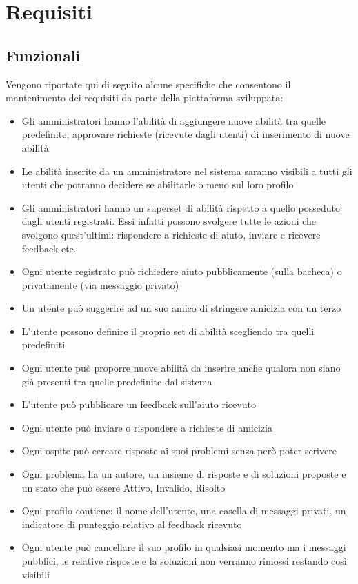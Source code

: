 \documentclass[a4paper,12pt]{article}
\begin{document}
\clearpage

\section{Requisiti}
\subsection{Funzionali}
Vengono riportate qui di seguito alcune specifiche che consentono il mantenimento dei requisiti da parte della piattaforma sviluppata:
\begin{itemize}
\item Gli amministratori hanno l’abilità di aggiungere nuove abilità tra quelle predefinite, approvare richieste (ricevute dagli utenti) di inserimento di nuove abilità
\item Le abilità inserite da un amministratore nel sistema saranno visibili a tutti gli utenti che potranno decidere se abilitarle o meno sul loro profilo
\item Gli amministratori hanno un superset di abilità rispetto a quello posseduto dagli utenti registrati. Essi infatti possono svolgere tutte le azioni che svolgono quest’ultimi: rispondere a richieste di aiuto, inviare e ricevere feedback etc.
\item Ogni utente registrato può richiedere aiuto pubblicamente (sulla bacheca) o privatamente (via messaggio privato)
\item Un utente può suggerire ad un suo amico di stringere amicizia con un terzo 
\item L’utente possono definire il proprio set di abilità scegliendo tra quelli predefiniti
\item Ogni utente può proporre nuove abilità da inserire anche qualora non siano già presenti tra quelle predefinite dal sistema
\item L’utente può pubblicare un feedback sull’aiuto ricevuto
\item Ogni utente può inviare o rispondere a richieste di amicizia
\item Ogni ospite può cercare risposte ai suoi problemi senza però poter scrivere
\item Ogni problema ha un autore, un insieme di risposte e di soluzioni proposte e un stato che può essere Attivo, Invalido, Risolto
\item Ogni profilo contiene: il nome dell’utente, una casella di messaggi privati, un indicatore di punteggio relativo al feedback ricevuto
\item Ogni utente può cancellare il suo profilo in qualsiasi momento ma i messaggi pubblici, le relative risposte e la soluzioni non verranno rimossi restando così visibili
\end{itemize}
\clearpage
\end{document}
